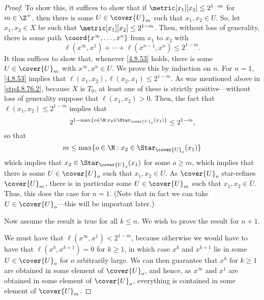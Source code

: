 \begin{thm}{}{}
\begin{proof}
To show this, it suffices to show that if $\metric[x_1][x_2]\leq 2^{1-m}$ for $m\in \Z ^+$, then there is some $U\in \cover{U}_m$ such that $x_1,x_2\in U$.  So, let $x_1,x_2\in X$ be such that $\metric[x_1][x_2]\leq 2^{1-m}$.  Then, without loss of generality, there is some path $\coord{x^\infty,\ldots ,x^n}$ from $x_1$ to $x_2$ with
\begin{equation}\label{4.8.53}
\ell (x^\infty,x^1)+\cdots +\ell (x^{n-1},x^n)\leq 2^{1-m}.
\end{equation}
It thus suffices to show that, whenever \eqref{4.8.53} holds, there is some $U\in \cover{U}_m$ with $x^\infty,x^n\in U$.  We prove this by induction on $n$.  For $n=1$, \eqref{4.8.53} implies that $\ell (x_1,x_2),\ell (x_2,x_1)\leq 2^{1-m}$.  As was mentioned above in \cref{stp4.8.76.2}, because $X$ is $T_0$, at least one of these is strictly positive---without loss of generality suppose that $\ell (x_1,x_2)>0$.  Then, the fact that $\ell (x_1,x_2)\leq 2^{1-m}$ implies that
\begin{equation}
2^{1-\max \{ o\in \N :x_2\in \Star _{\cover{U}_o}(x_1)\}}\leq 2^{1-m},
\end{equation}
so that
\begin{equation}
m\leq \max \{ o\in \N :x_2\in \Star _{\cover{U}_o}(x_1)\} 
\end{equation}
which implies that $x_2\in \Star _{\cover{U}_{o}}(x_1)$ for some $o\geq m$, which implies that there is some $U\in \cover{U}_{o}$ such that $x_1,x_2\in U$.  As $\cover{U}_o$ star-refines $\cover{U}_m$, there is in particular some $U\in \cover{U}_m$ such that $x_1,x_2\in U$.  Thus, this does the case for $n=1$.  (Note that in fact we can take $U\in \cover{U}_{o}$---this will be important later.)

Now assume the result is true for all $k\leq n$.  We wish to prove the result for $n+1$.

We must have that $\ell (x^\infty,x^1)<2^{1-m}$, because otherwise we would have to have that $\ell (x^k,x^{k+1})=0$ for $k\geq 1$, in which case $x^k$ and $x^{k+1}$ lie in some $U\in \cover{U}_o$ for $o$ arbitrarily large.  We can then guarantee that $x^k$ for $k\geq 1$ are obtained in some element of $\cover{U}_{o}$, and hence, as $x^\infty$ and $x^1$ are obtained in some element of $\cover{U}_{o}$, everything is contained in some element of $\cover{U}_m$.


\end{proof}
\end{thm}
